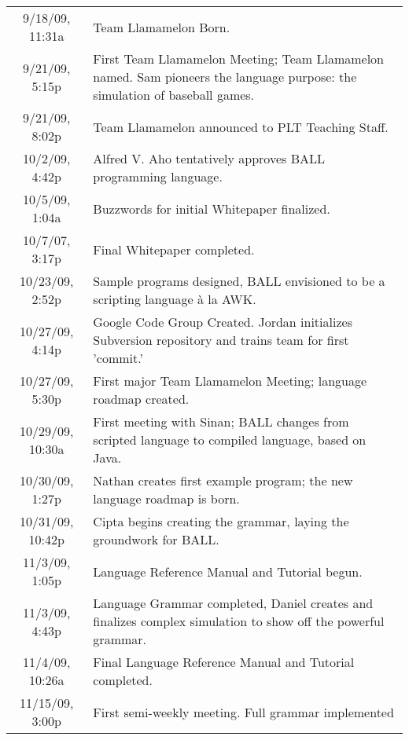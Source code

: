 \begin{center}
\tablelasttail{\hline}
\small

\begin{supertabular}{|c|p{5in}|}
9/18/09, 11:31a & Team Llamamelon Born.\\
9/21/09, 5:15p & First Team Llamamelon Meeting; Team Llamamelon
named. Sam pioneers the language purpose: the simulation of baseball
games.\\
9/21/09, 8:02p & Team Llamamelon announced to PLT Teaching Staff.\\
10/2/09, 4:42p & Alfred V. Aho tentatively approves BALL programming
language.\\
10/5/09, 1:04a & Buzzwords for initial Whitepaper finalized.\\
10/7/07, 3:17p & Final Whitepaper completed.\\
10/23/09, 2:52p & Sample programs designed, BALL envisioned to be a
scripting language à la AWK.\\
10/27/09, 4:14p & Google Code Group Created. Jordan initializes
Subversion repository and trains team for first 'commit.'\\
10/27/09, 5:30p & First major Team Llamamelon Meeting; language
roadmap created.\\
10/29/09, 10:30a & First meeting with Sinan; BALL changes from
scripted language to compiled language, based on Java.\\
10/30/09, 1:27p & Nathan creates first example program; the new
language roadmap is born.\\
10/31/09, 10:42p & Cipta begins creating the grammar, laying the
groundwork for BALL.\\
11/3/09, 1:05p & Language Reference Manual and Tutorial begun.\\
11/3/09, 4:43p & Language Grammar completed, Daniel creates and
finalizes complex simulation to show off the powerful grammar.\\
11/4/09, 10:26a & Final Language Reference Manual and Tutorial
completed.\\
11/15/09, 3:00p & First semi-weekly meeting. Full grammar implemented

\end{supertabular}
\end{center}
